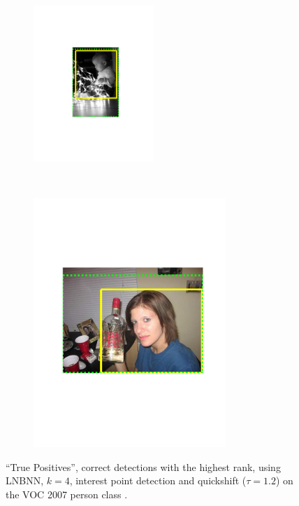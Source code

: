 \begin{figure}[hbt]
    \begin{subfigure}[b]{0.37\textwidth}
        \centering
        \includegraphics[width=0.5\textwidth]{TP48}
        \caption{}
        \label{fig:dettp3}
    \end{subfigure}
    ~
    \begin{subfigure}[b]{0.37\textwidth}
        \centering
        \includegraphics[width=0.8\textwidth]{TP63}
        \caption{}
        \label{fig:dettp4}
    \end{subfigure}
    \caption{``True Positives'', correct detections with the highest rank, using LNBNN, $k=4$, interest point detection and quickshift ($\tau=1.2$) on the VOC 2007 person class \cite{pascal-voc-2007}.}
    \label{fig:dettp}
\end{figure}

